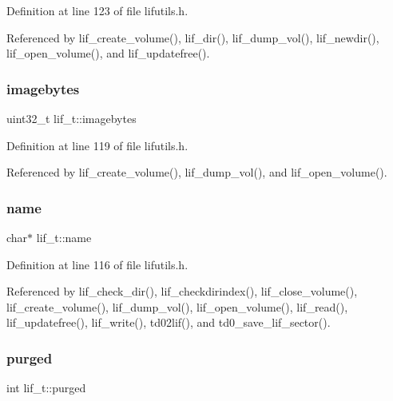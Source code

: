 Definition at line 123 of file lifutils.\+h.



Referenced by lif\+\_\+create\+\_\+volume(), lif\+\_\+dir(), lif\+\_\+dump\+\_\+vol(), lif\+\_\+newdir(), lif\+\_\+open\+\_\+volume(), and lif\+\_\+updatefree().

\mbox{\label{structlif__t_afabd64e66adb03eef2249b6c627faac7}} 
\subsubsection{\texorpdfstring{imagebytes}{imagebytes}}
{\footnotesize\ttfamily uint32\+\_\+t lif\+\_\+t\+::imagebytes}



Definition at line 119 of file lifutils.\+h.



Referenced by lif\+\_\+create\+\_\+volume(), lif\+\_\+dump\+\_\+vol(), and lif\+\_\+open\+\_\+volume().

\mbox{\label{structlif__t_ae6b943f3c26005fc375169960e9049f7}} 
\subsubsection{\texorpdfstring{name}{name}}
{\footnotesize\ttfamily char$\ast$ lif\+\_\+t\+::name}



Definition at line 116 of file lifutils.\+h.



Referenced by lif\+\_\+check\+\_\+dir(), lif\+\_\+checkdirindex(), lif\+\_\+close\+\_\+volume(), lif\+\_\+create\+\_\+volume(), lif\+\_\+dump\+\_\+vol(), lif\+\_\+open\+\_\+volume(), lif\+\_\+read(), lif\+\_\+updatefree(), lif\+\_\+write(), td02lif(), and td0\+\_\+save\+\_\+lif\+\_\+sector().

\mbox{\label{structlif__t_a1dfef3ca99d6ba9680bb9b6bf8fafc32}} 
\subsubsection{\texorpdfstring{purged}{purged}}
{\footnotesize\ttfamily int lif\+\_\+t\+::purged}



